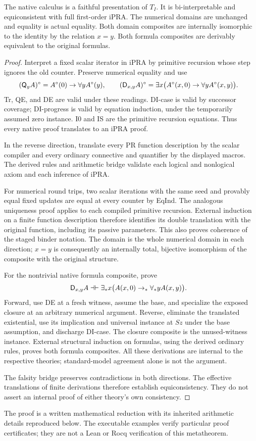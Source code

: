 \begin{theorem}
\label{thm:new-equivalence}
The native calculus is a faithful presentation of $T_I$. It is
bi-interpretable and equiconsistent with full first-order iPRA. The
numerical domains are unchanged and equality is actual equality.
Both domain composites are internally isomorphic to the identity by
the relation $x=y$. Both formula composites are derivably equivalent
to the original formulas.
\end{theorem}
\begin{proof}
Interpret a fixed scalar iterator in iPRA by primitive recursion whose
step ignores the old counter. Preserve numerical equality and use
\[
 (\mathsf Q_yA)^\circ=A^\circ(0)\to\forall y A^\circ(y),\qquad
 (\mathsf D_{x,y}A)^\circ=
 \exists x\bigl(A^\circ(x,0)\to\forall y A^\circ(x,y)\bigr).
\]
Tr, QE, and DE are valid under these readings. DI-case is valid by
successor coverage; DI-progress is valid by equation induction, under
the temporarily assumed zero instance. I0 and IS are the primitive
recursion equations. Thus every native proof translates to an iPRA proof.

In the reverse direction, translate every PR function description by
the scalar compiler and every ordinary connective and quantifier by
the displayed macros. The derived rules and arithmetic bridge validate
each logical and nonlogical axiom and each inference of iPRA.

For numerical round trips, two scalar iterations with the same seed
and provably equal fixed updates are equal at every counter by EqInd.
The analogous uniqueness proof applies to each compiled primitive
recursion. External induction on a finite function description therefore
identifies its double translation with the original function, including
its passive parameters. This also proves coherence of the staged binder
notation. The domain is the whole numerical domain in each direction;
$x=y$ is consequently an internally total, bijective isomorphism of
the composite with the original structure.

For the nontrivial native formula composite, prove
\[
 \mathsf D_{x,y}A\dashv\vdash
 \exists_*x\bigl(A(x,0)\to_*\forall_*y A(x,y)\bigr).
\]
Forward, use DE at a fresh witness, assume the base, and specialize
the exposed closure at an arbitrary numerical argument. Reverse,
eliminate the translated existential, use its implication and universal
instance at $Sz$ under the base assumption, and discharge DI-case.
The closure composite is the unused-witness instance. External
structural induction on formulas, using the derived ordinary rules,
proves both formula composites. All these derivations are internal to
the respective theories; standard-model agreement alone is not the
argument.

The falsity bridge preserves contradictions in both directions.
The effective translations of finite derivations therefore establish
equiconsistency. They do not assert an internal proof of either
theory's own consistency.
\end{proof}

The proof is a written mathematical reduction with its inherited
arithmetic details reproduced below. The executable examples verify
particular proof certificates; they are not a Lean or Rocq verification
of this metatheorem.
